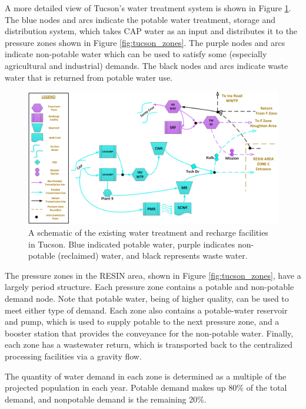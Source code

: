 \documentclass[opre,nonblindrev]{informs3} %
\begin{document}
A more detailed view of Tucson's water treatment system is shown in Figure \ref{fig:tucson_treatment}.
The blue nodes and arcs indicate the potable water treatment, storage and distribution system, which takes CAP water as an input and distributes it to the pressure zones shown in Figure \ref{fig:tucson_zones}.
The purple nodes and arcs indicate non-potable water which can be used to satisfy some (especially agricultural and industrial) demands.
The black nodes and arcs indicate waste water that is returned from potable water use.

\begin{figure}
	\FIGURE
	{%
		\includegraphics*[width=.8\textwidth]{tucson_water_images/nodes_central.png}%
	}
	{
		A schematic of the existing water treatment and recharge facilities in Tucson.
		Blue indicated potable water, purple indicates non-potable (reclaimed) water, and black represents waste water.
		\label{fig:tucson_treatment}
	}
	{}
\end{figure}

The pressure zones in the RESIN area, shown in Figure \ref{fig:tucson_zones}, have a largely period structure.
Each pressure zone contains a potable and non-potable demand node.
Note that potable water, being of higher quality, can be used to meet either type of demand.
Each zone also contains a potable-water reservoir and pump, which is used to supply potable to the next pressure zone, and a booster station that provides the conveyance for the non-potable water.
Finally, each zone has a wastewater return, which is transported back to the centralized processing facilities via a gravity flow.

The quantity of water demand in each zone is determined as a multiple of the projected population in each year.
Potable demand makes up 80\% of the total demand, and nonpotable demand is the remaining 20\%.
\end{document}
